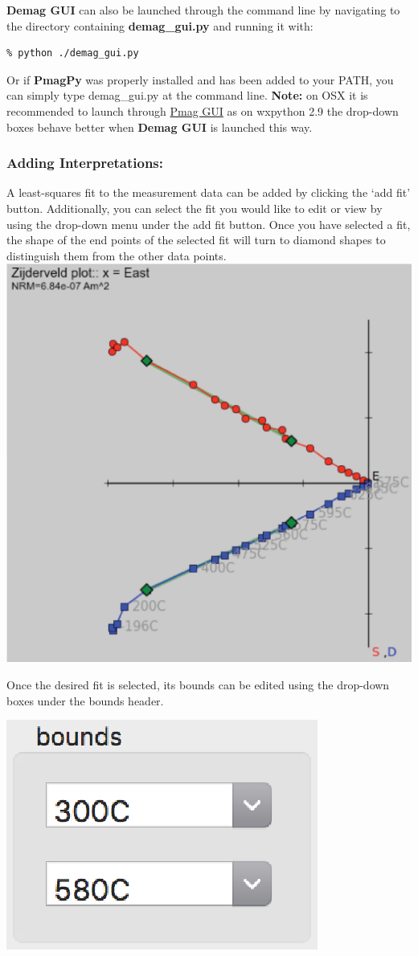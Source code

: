 \documentclass[11pt]{book}
\begin{document}
{\bf Demag GUI} can also be launched through the command line by navigating to the directory containing {\bf demag\_gui.py}  and running it with:

\begin{verbatim}
% python ./demag_gui.py
\end{verbatim}

Or if {\bf PmagPy} was properly installed and has been added to your PATH, you can simply type
demag\_gui.py at the command line. \textbf{Note:} on OSX it is
recommended to launch through \href{#pmag_gui.py}{Pmag GUI} as on wxpython 2.9 the drop-down boxes behave better when {\bf Demag GUI} is launched this way.

\subsubsection{Adding Interpretations:}\label{adding-interpretations}

A least-squares fit to the measurement data can be added by clicking the `add fit' button. Additionally, you can select the fit you would like to edit or view by using the drop-down menu under the add fit button. Once you have selected a fit, the shape of the end points of the selected fit will turn to diamond shapes to distinguish them from the other data points.\\
\includegraphics[width=10 cm]{EPSfiles/demag_gui_Fit.eps}

Once the desired fit is selected, its bounds can be edited using the drop-down boxes under the bounds header.

\includegraphics[width=3 cm]{EPSfiles/demag_gui_BoundsBox.eps}
\end{document}
